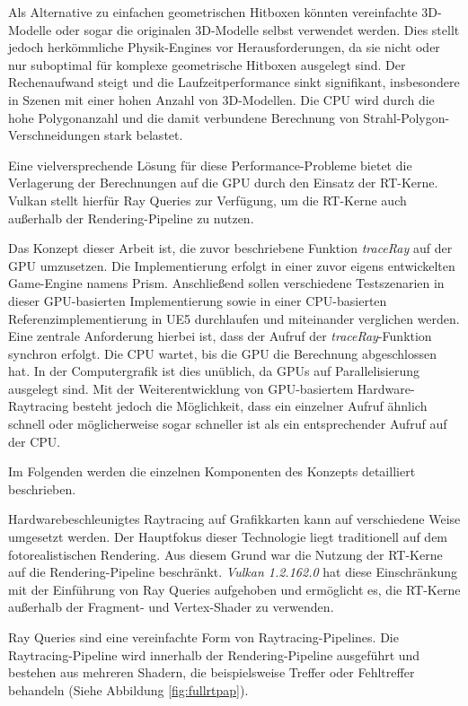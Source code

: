 \documentclass[11pt]{scrartcl}
\begin{document}
{	Als Alternative zu einfachen geometrischen Hitboxen könnten vereinfachte 3D-Modelle oder sogar die originalen 3D-Modelle selbst verwendet werden. Dies stellt jedoch herkömmliche Physik-Engines vor Herausforderungen, da sie nicht oder nur suboptimal für komplexe geometrische Hitboxen ausgelegt sind. Der Rechenaufwand steigt und die Laufzeitperformance sinkt signifikant, insbesondere in Szenen mit einer hohen Anzahl von 3D-Modellen. Die CPU wird durch die hohe Polygonanzahl und die damit verbundene Berechnung von Strahl-Polygon-Verschneidungen stark belastet.
	
	Eine vielversprechende Lösung für diese Performance-Probleme bietet die Verlagerung der Berechnungen auf die GPU durch den Einsatz der RT-Kerne. Vulkan stellt hierfür Ray Queries zur Verfügung, um die RT-Kerne auch außerhalb der Rendering-Pipeline zu nutzen.

	Das Konzept dieser Arbeit ist, die zuvor beschriebene Funktion \textit{traceRay} auf der GPU umzusetzen. Die Implementierung erfolgt in einer zuvor eigens entwickelten Game-Engine namens Prism. Anschließend sollen verschiedene Testszenarien in dieser GPU-basierten Implementierung sowie in einer CPU-basierten Referenzimplementierung in UE5 durchlaufen und miteinander verglichen werden. Eine zentrale Anforderung hierbei ist, dass der Aufruf der \textit{traceRay}-Funktion synchron erfolgt. Die CPU wartet, bis die GPU die Berechnung abgeschlossen hat. In der Computergrafik ist dies unüblich, da GPUs auf Parallelisierung ausgelegt sind. Mit der Weiterentwicklung von GPU-basiertem Hardware-Raytracing besteht jedoch die Möglichkeit, dass ein einzelner Aufruf ähnlich schnell oder möglicherweise sogar schneller ist als ein entsprechender Aufruf auf der CPU.
	
	\noindent Im Folgenden werden die einzelnen Komponenten des Konzepts detailliert beschrieben.
	
	Hardwarebeschleunigtes Raytracing auf Grafikkarten kann auf verschiedene Weise umgesetzt werden. Der Hauptfokus dieser Technologie liegt traditionell auf dem fotorealistischen Rendering. Aus diesem Grund war die Nutzung der RT-Kerne auf die Rendering-Pipeline beschränkt. \textit{Vulkan 1.2.162.0} hat diese Einschränkung mit der Einführung von Ray Queries aufgehoben und ermöglicht es, die RT-Kerne außerhalb der Fragment- und Vertex-Shader zu verwenden\cite{Koch2020}.
	
	Ray Queries sind eine vereinfachte Form von Raytracing-Pipelines. Die Raytracing-Pipeline wird innerhalb der Rendering-Pipeline ausgeführt und bestehen aus mehreren Shadern, die beispielsweise Treffer oder Fehltreffer behandeln (Siehe Abbildung \ref{fig:fullrtpap}). 
	
}
\end{document}
